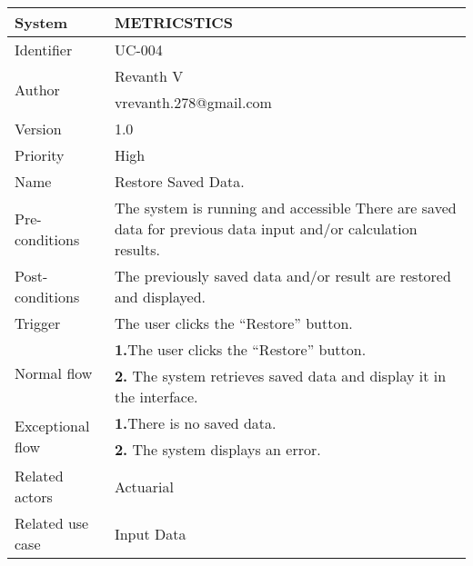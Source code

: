 \begin{table}[htb]
    \centering
    \begin{tabular}{|p{4cm}|p{12cm}|} \hline 
         System &  METRICSTICS\\ \hline 
         
         Identifier & UC-004 \\ \hline 
         
         \multirow{2}{*}{Author} & Revanth V  \\
         &vrevanth.278@gmail.com \\
           \hline 
           Version & 1.0\\ \hline
         
         Priority &  High\\ \hline 
         
         Name & Restore Saved Data. \\ \hline 
         Pre-conditions & The system is running and accessible
There are saved data for previous data input and/or calculation results.\\ \hline 
         Post-conditions & The previously saved data and/or result are restored and displayed. \\ \hline
         Trigger & The user clicks the “Restore” button. \\ \hline
        \multirow{2}{*}{Normal flow} 
        & \textbf{1.}The user clicks the “Restore” button. \\ 
        & \textbf{2.} The system retrieves saved data and display it in the interface.  \\ 
         
         \hline
         \multirow{2}{*}{Exceptional flow} 
        & \textbf{1.}There is no saved data. \\ 
        & \textbf{2.} The system displays an error.  \\  \hline 
        Related actors & Actuarial  \\ \hline
        Related use case & Input Data \\ \hline
    \end{tabular}
    \caption{}
    \label{tab:my_label}
\end{table}

